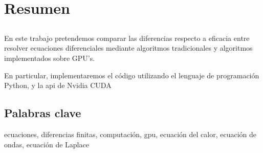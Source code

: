 \chapter*{Resumen}

\section*{\tituloPortadaVal}


En este trabajo pretendemos comparar las diferencias respecto a eficacia entre resolver ecuaciones diferenciales mediante algoritmos tradicionales y algoritmos implementados sobre GPU's.

En particular, implementaremos el código utilizando el lenguaje de programación Python, y la api de Nvidia CUDA


\section*{Palabras clave}
   

\noindent ecuaciones, diferencias finitas, computación, gpu, ecuación del calor, ecuación de ondas, ecuación de Laplace







